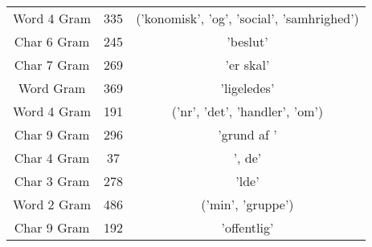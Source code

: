 \begin{table}
\begin{tabular}{ccc}
Word 4 Gram & 335 & ('konomisk', 'og', 'social', 'samhrighed')\\
Char 6 Gram & 245 & 'beslut'\\
Char 7 Gram & 269 & 'er skal'\\
Word Gram & 369 & 'ligeledes'\\
Word 4 Gram & 191 & ('nr', 'det', 'handler', 'om')\\
Char 9 Gram & 296 & 'grund af '\\
Char 4 Gram & 37 & ', de'\\
Char 3 Gram & 278 & 'lde'\\
Word 2 Gram & 486 & ('min', 'gruppe')\\
Char 9 Gram & 192 & 'offentlig'\\
\end{tabular}
\end{table}




